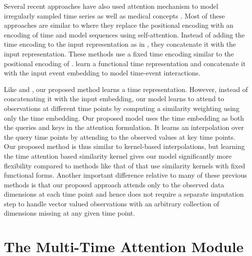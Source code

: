 \documentclass{article} \usepackage{iclr2021_conference,times}
\begin{document}
Several recent approaches have also used attention mechanism to model irregularly sampled time series \citep{attendanddiagnose2018,datagru2020,attain2019} as well as medical concepts \citep{tempselfatt2019,medicalconcept2018}. Most of these approaches are similar to  \citet{transformer} where they replace the positional encoding with an encoding of time and model sequences using self-attention. Instead of adding the time encoding to the input representation as in \citet{transformer}, they concatenate it with the input representation. These methods use a fixed time encoding similar to the positional encoding of \citet{transformer}. \citet{selfatttimeemb2019}  learn a functional time representation and concatenate it with the input event embedding to model time-event interactions. 

Like \citet{selfatttimeemb2019} and \citet{time2vec2020}, our proposed method learns a time representation. However, instead of concatenating it with the input embedding, our model learns to attend to observations at different time points by computing a similarity weighting using only the time embedding. Our proposed model uses the time embedding as both the queries and keys in the attention formulation. It learns an interpolation over the query time points by attending to the observed values at key time points. Our proposed method is thus similar to kernel-based interpolations, but learning the time attention based similarity kernel gives our model significantly more flexibility compared to methods like that of \citet{shukla2019} that use similarity kernels with fixed functional forms. Another important difference relative to many of these previous methods is that our proposed approach attends only to the observed data dimensions at each time point and hence does not require a separate imputation step to handle vector valued observations with an arbitrary collection of dimensions missing at any given time point.




















%
 \section{The Multi-Time Attention Module}
\end{document}
